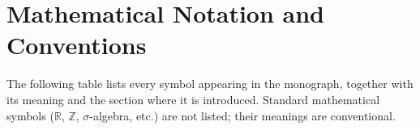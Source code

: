 
\section*{Mathematical Notation and Conventions}

The following table lists every symbol appearing in the monograph, together
with its meaning and the section where it is introduced.  Standard
mathematical symbols ($\mathbb{R}$, $\mathbb{Z}$, $\sigma$-algebra, etc.)
are not listed; their meanings are conventional.

